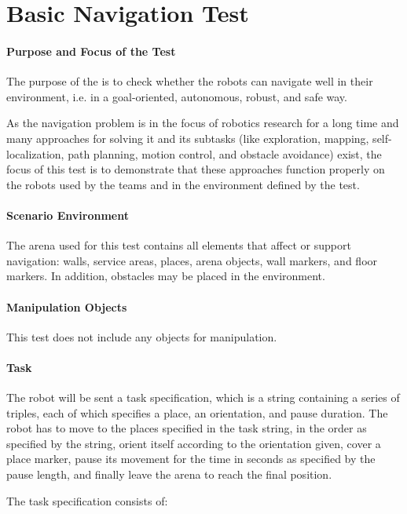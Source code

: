 \newpage
\section{Basic Navigation Test}

\paragraph{Purpose and Focus of the Test}
The purpose of the  is to check whether the robots can navigate well in their environment, i.e. in a goal-oriented, autonomous, robust, and safe way.
\par
As the navigation problem is in the focus of robotics research for a long time and many approaches for solving it and its subtasks (like exploration, mapping, self-localization, path planning, motion control, and obstacle avoidance) exist, the focus of this test is to demonstrate that these approaches function properly on the robots used by the teams and in the environment defined by the test.
\par

\paragraph{Scenario Environment}
The arena used for this test contains all elements that affect or support navigation: walls, service areas, places, arena objects, wall markers, and floor markers. In addition, obstacles may be placed in the environment.

\paragraph{Manipulation Objects}
This test does not include any objects for manipulation.
\paragraph{Task}
The robot will be sent a task specification, which is a string containing a series of triples, each of which specifies a place, an orientation, and pause duration. The robot has to move to the places specified in the task string, in the order as specified by the string, orient itself according to the orientation given, cover a place marker, pause its movement for the time in seconds as specified by the pause length, and finally leave the arena to reach the final position.

The task specification consists of:

